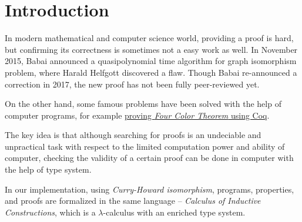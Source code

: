 \section{Introduction}

In modern mathematical and computer science world, providing a proof is hard, but confirming its correctness
is sometimes not a easy work as well. In November 2015, Babai announced a quasipolynomial 
time algorithm for graph isomorphism problem, where Harald Helfgott discovered a flaw. 
Though Babai re-announced a correction in 2017, the new proof has not been fully peer-reviewed yet.\par
On the other hand, some famous problems have been solved with the help of computer programs,
for example \href{http://www.ams.org/journals/notices/200811/tx081101382p.pdf}{proving {\it Four Color Theorem} using Coq}.\par
The key idea is that although searching for proofs is an undeciable and unpractical task with respect to the 
limited computation power and ability of computer, 
checking the validity of a certain proof can be done in computer with the help of type system.\par
In our implementation, using {\it Curry-Howard isomorphism}, programs, properties, and proofs are formalized in the same 
language -- {\it Calculus of Inductive Constructions}, which is a $\lambda$-calculus with an enriched type system.

